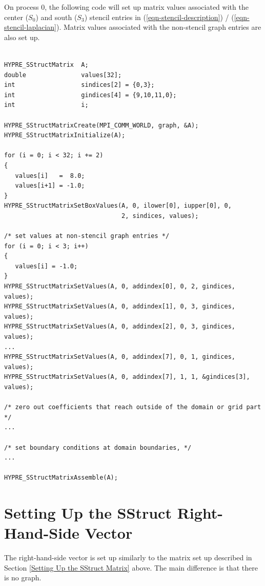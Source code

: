 On process 0, the following code will set up matrix values associated
with the center ($S_0$) and south ($S_3$) stencil entries in
(\ref{eqn-stencil-description}) / (\ref{eqn-stencil-laplacian}).
Matrix values associated with the non-stencil graph entries are also
set up.
\begin{display}
\begin{verbatim}

HYPRE_SStructMatrix  A;
double               values[32];
int                  sindices[2] = {0,3};
int                  gindices[4] = {9,10,11,0};
int                  i;

HYPRE_SStructMatrixCreate(MPI_COMM_WORLD, graph, &A);
HYPRE_SStructMatrixInitialize(A);

for (i = 0; i < 32; i += 2)
{
   values[i]   =  8.0;
   values[i+1] = -1.0;
}
HYPRE_SStructMatrixSetBoxValues(A, 0, ilower[0], iupper[0], 0,
                                2, sindices, values);

/* set values at non-stencil graph entries */
for (i = 0; i < 3; i++)
{
   values[i] = -1.0;
}
HYPRE_SStructMatrixSetValues(A, 0, addindex[0], 0, 2, gindices, values);
HYPRE_SStructMatrixSetValues(A, 0, addindex[1], 0, 3, gindices, values);
HYPRE_SStructMatrixSetValues(A, 0, addindex[2], 0, 3, gindices, values);
...
HYPRE_SStructMatrixSetValues(A, 0, addindex[7], 0, 1, gindices, values);
HYPRE_SStructMatrixSetValues(A, 0, addindex[7], 1, 1, &gindices[3], values);

/* zero out coefficients that reach outside of the domain or grid part */
...

/* set boundary conditions at domain boundaries, */
...

HYPRE_SStructMatrixAssemble(A);

\end{verbatim}
\end{display}


\section{Setting Up the SStruct Right-Hand-Side Vector}
\label{Setting Up the SStruct Right-Hand-Side Vector}

The right-hand-side vector is set up similarly to the matrix set up
described in Section \ref{Setting Up the SStruct Matrix} above.  The
main difference is that there is no graph.


